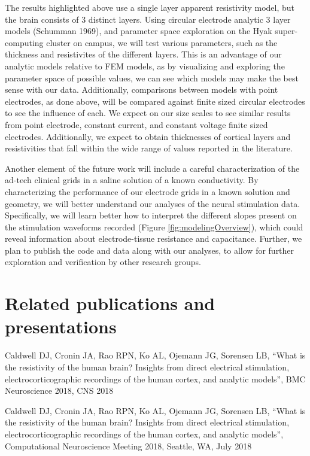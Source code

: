 The results highlighted above use a single layer apparent resistivity model, but the brain consists of 3 distinct layers. Using circular electrode analytic 3 layer models (Schumman 1969), and parameter space exploration on the Hyak super-computing cluster on campus, we will test various parameters, such as the thickness and resistivites of the different layers. This is an advantage of our analytic models relative to FEM models, as by visualizing and exploring the parameter space of possible values, we can see which models may make the best sense with our data. Additionally, comparisons between models with point electrodes, as done above, will be compared against finite sized circular electrodes to see the influence of each. We expect on our size scales to see similar results from point electrode, constant current, and constant voltage finite sized electrodes. Additionally, we expect to obtain thicknesses of cortical layers and resistivities that fall within the wide range of values reported in the literature. 

Another element of the future work will include a careful characterization of the ad-tech clinical grids in a saline solution of a known conductivity. By characterizing the performance of our electrode grids in a known solution and geometry, we will better understand our analyses of the neural stimulation data. Specifically, we will learn better how to interpret the different slopes present on the stimulation waveforms recorded (Figure \ref{fig:modelingOverview}), which could reveal information about electrode-tissue resistance and capacitance. Further, we plan to publish the code and data along with our analyses, to allow for further exploration and verification by other research groups. 

\section{Related publications and presentations}

\noindent Caldwell DJ, Cronin JA, Rao RPN, Ko AL, Ojemann JG, Sorensen LB, “What is the resistivity of the human brain? Insights from direct electrical stimulation, electrocorticographic recordings of the human cortex, and analytic models”, BMC Neuroscience 2018, CNS 2018 \\
\medskip

\noindent Caldwell DJ, Cronin JA, Rao RPN, Ko AL, Ojemann JG, Sorensen LB, “What is the resistivity of the human brain? Insights from direct electrical stimulation, electrocorticographic recordings of the human cortex, and analytic models”, Computational Neuroscience Meeting 2018, Seattle, WA, July 2018 \\
\medskip


